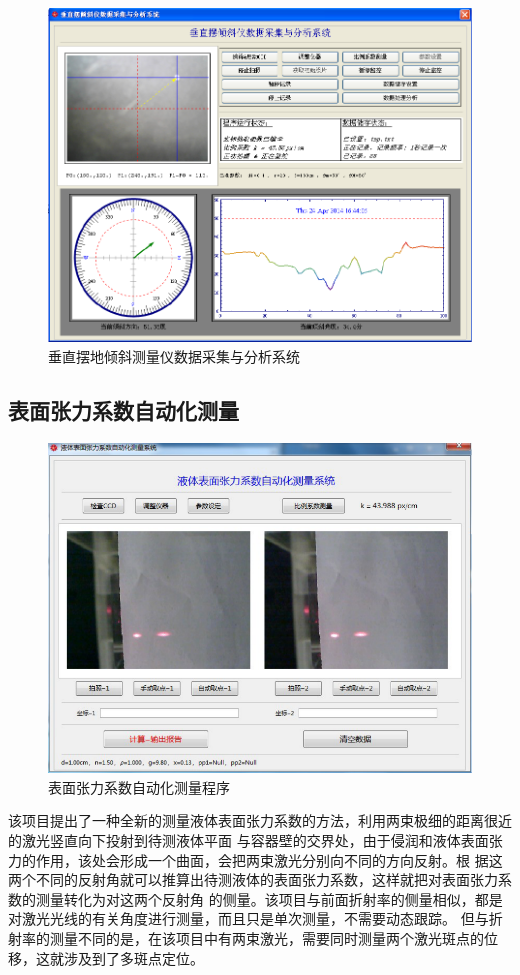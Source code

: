 \documentclass[UTF8,a4paper,12pt]{article}
\begin{document}
\begin{figure}[htbp]
\centering
\includegraphics[width=120mm]{image/chuizhibai.pdf}
\caption{垂直摆地倾斜测量仪数据采集与分析系统}\label{fig:chuizhibai}
\end{figure}

\subsection{表面张力系数自动化测量}

\begin{figure}[htbp]
\centering
\includegraphics[width=120mm]{image/biaomianzhangli.pdf}
\caption{表面张力系数自动化测量程序}\label{fig:biaomianzhangli}
\end{figure}

该项目提出了一种全新的测量液体表面张力系数的方法，利用两束极细的距离很近的激光竖直向下投射到待测液体平面
与容器壁的交界处，由于侵润和液体表面张力的作用，该处会形成一个曲面，会把两束激光分别向不同的方向反射。根
据这两个不同的反射角就可以推算出待测液体的表面张力系数，这样就把对表面张力系数的测量转化为对这两个反射角
的侧量。该项目与前面折射率的侧量相似，都是对激光光线的有关角度进行测量，而且只是单次测量，不需要动态跟踪。
但与折射率的测量不同的是，在该项目中有两束激光，需要同时测量两个激光斑点的位移，这就涉及到了多斑点定位。
\end{document}
